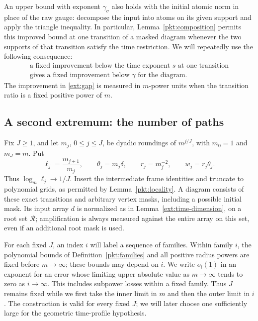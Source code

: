 An upper bound with exponent \(\gamma_\sigma\) also holds with the
initial atomic norm in place of the raw gauge: decompose the input
into atoms on its given support and apply the triangle inequality.
In particular, Lemma~\ref{pkt:composition} permits this improved bound
at one transition of a masked diagram whenever the two supports of
that transition satisfy the time restriction. We will repeatedly use
the following consequence:
\begin{equation}\label{ext:gap}
 \begin{gathered}
 \text{a fixed improvement below the time exponent \(s\) at one transition}\\
 \text{gives a fixed improvement below \(\gamma\) for the diagram.}
 \end{gathered}
\end{equation}
The improvement in \eqref{ext:gap} is measured in \(m\)-power units
when the transition ratio is a fixed positive power of \(m\).

\subsection{A second extremum: the number of paths}

Fix \(J\geq1\), and let \(m_j\), \(0\leq j\leq J\), be dyadic
roundings of \(m^{j/J}\), with \(m_0=1\) and \(m_J=m\). Put
\[
 \ell_j=\frac{m_{j+1}}{m_j},\qquad
 \theta_j=m_j\delta,\qquad r_j=m_j^{-2},\qquad w_j=r_j\theta_j .
\]
Thus \(\log_m\ell_j\to1/J\). Insert the intermediate frame
identities and truncate to polynomial grids, as permitted by
Lemma~\ref{pkt:locality}. A diagram consists of these exact transitions
and arbitrary vertex masks, including a possible initial mask.
Its input array \(d\) is normalized as in Lemma~\ref{ext:time-dimension},
on a root set \(\mathcal R\); amplification is always measured against
the entire array on this set, even if an additional root mask is used.

For each fixed \(J\), an index \(i\) will label a sequence of families.
Within family \(i\), the polynomial bounds of
Definition~\ref{pkt:families} and all positive radius powers are fixed
before \(m\to\infty\); these bounds may depend on \(i\).
We write \(o_i(1)\) in an exponent for an error whose limiting upper
absolute value as \(m\to\infty\) tends to zero as \(i\to\infty\).
This includes subpower losses within a fixed family. Thus \(J\)
remains fixed while we first take the inner limit in \(m\) and then
the outer limit in \(i\). The construction is valid for every fixed
\(J\); we will later choose one sufficiently large for the geometric
time-profile hypothesis.

